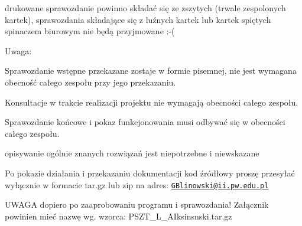 drukowane sprawozdanie powinno składać się ze zszytych (trwale zespolonych kartek), sprawozdania składające się z luźnych kartek lub kartek spiętych spinaczem biurowym nie będą przyjmowane \+:-\/(

Uwaga\+:
\begin{DoxyEnumerate}
\item Sprawozdanie wstępne przekazane zostaje w formie pisemnej, nie jest wymagana obecność całego zespołu przy jego przekazaniu.
\item Konsultacje w trakcie realizacji projektu nie wymagają obecności całego zespołu.
\item Sprawozdanie końcowe i pokaz funkcjonowania musi odbywać się w obecności całego zespołu.
\item opisywanie ogólnie znanych rozwiązań jest niepotrzebne i niewskazane
\item Po pokazie działania i przekazaniu dokumentacji kod źródłowy proszę przesyłać wyłącznie w formacie tar.\+gz lub zip na adres\+: \href{mailto:GBlinowski@ii.pw.edu.pl}{\tt G\+Blinowski@ii.\+pw.\+edu.\+pl}
\end{DoxyEnumerate}

U\+W\+A\+GA dopiero po zaaprobowaniu programu i sprawozdania! Załącznik powinien mieć nazwę wg. wzorca\+: P\+S\+Z\+T\+\_\+L\+\_\+\+A\+Iksinsnski.\+tar.\+gz 